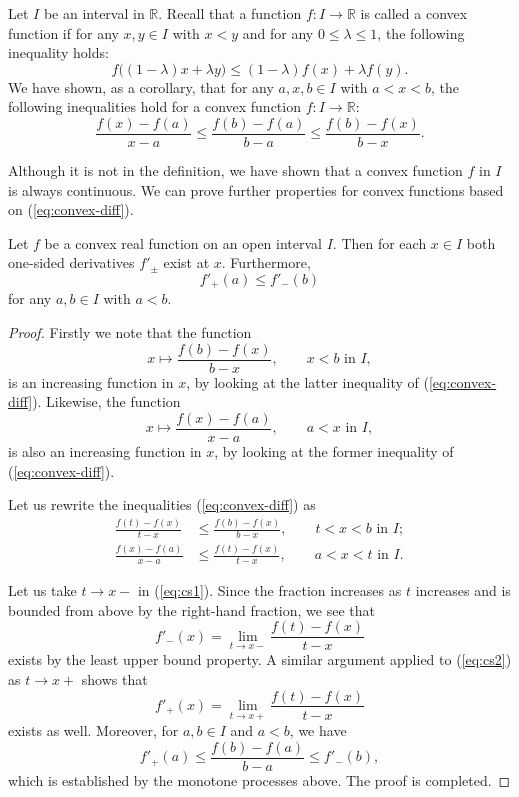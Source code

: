 Let $I$ be an interval in $\mathbb{R}$.
Recall that a function $f: I \to \mathbb{R}$ is called a \textsf{convex function} if for any $x, y \in I$ with $x < y$ and for any $0 \leqslant \lambda \leqslant 1$, the following inequality holds:
\begin{equation}
  \label{eq:convex}
  f \bigl( (1-\lambda) x + \lambda y \bigr) \leqslant (1-\lambda) f(x) + \lambda f(y).
\end{equation}
We have shown, as a corollary, that for any $a, x, b \in I$ with $a < x < b$, the following inequalities hold for a convex function $f: I \to \mathbb{R}$:
\begin{equation}
  \label{eq:convex-diff}
  \frac{ f(x) - f(a) }{ x - a } \leqslant \frac{ f(b) - f(a) }{ b - a } \leqslant \frac{ f(b) - f(x) }{ b - x }.
\end{equation}

Although it is not in the definition, we have shown that a convex function $f$ in $I$ is always continuous.
We can prove further properties for convex functions based on (\ref{eq:convex-diff}).

\begin{thm}
  \label{thm:convex-onesided}
  Let $f$ be a convex real function on an open interval $I$.
  Then for each $x \in I$ both one-sided derivatives $f'_{\pm}$ exist at $x$.
  Furthermore,
  \[
    f'_+(a) \leqslant f'_-(b)
  \]
  for any $a, b \in I$ with $a < b$.
\end{thm}

\begin{proof}
  Firstly we note that the function
  \[
    x \mapsto \frac{ f(b) - f(x) }{ b - x }, \qquad x < b \text{ in $I$},
  \]
  is an increasing function in $x$, by looking at the latter inequality of (\ref{eq:convex-diff}).
  Likewise, the function
  \[
    x \mapsto \frac{ f(x) - f(a) }{ x - a }, \qquad a < x \text{ in $I$},
  \]
  is also an increasing function in $x$, by looking at the former inequality of (\ref{eq:convex-diff}).

  Let us rewrite the inequalities (\ref{eq:convex-diff}) as
  \begin{align}
    \frac{ f(t) - f(x) }{ t - x } &\leqslant \frac{ f(b) - f(x) }{ b - x }, \qquad t < x < b \text{ in $I$}; \label{eq:cs1} \\
    \frac{ f(x) - f(a) }{ x - a } &\leqslant \frac{ f(t) - f(x) }{ t - x }, \qquad a < x < t \text{ in $I$}. \label{eq:cs2}
  \end{align}

  Let us take $t \to x-$ in (\ref{eq:cs1}).
  Since the fraction increases as $t$ increases and is bounded from above by the right-hand fraction, we see that
  \[
    f'_-(x) = \lim_{t \to x-} \frac{ f(t) - f(x) }{ t - x }
  \]
  exists by the least upper bound property.
  A similar argument applied to (\ref{eq:cs2}) as $t \to x+$ shows that
  \[
    f'_+(x) = \lim_{t \to x+} \frac{ f(t) - f(x) }{ t - x }
  \]
  exists as well.
  Moreover, for $a, b \in I$ and $a < b$, we have
  \[
    f'_+(a) \leqslant \frac{ f(b) - f(a) }{ b - a } \leqslant f'_-(b),
  \]
  which is established by the monotone processes above.
  The proof is completed.
\end{proof}

